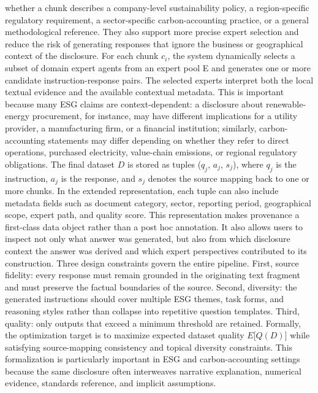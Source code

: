 \documentclass[9pt,twocolumn]{extarticle}
\begin{document}
whether a chunk describes a company-level sustainability policy, a
region-specific regulatory requirement, a sector-specific
carbon-accounting practice, or a general methodological reference. They
also support more precise expert selection and reduce the risk of
generating responses that ignore the business or geographical context of
the disclosure.
For each chunk \(c_{i}\), the system dynamically selects a subset of
domain expert agents from an expert pool E and generates one or more
candidate instruction-response pairs. The selected experts interpret
both the local textual evidence and the available contextual metadata.
This is important because many ESG claims are context-dependent: a
disclosure about renewable-energy procurement, for instance, may have
different implications for a utility provider, a manufacturing firm, or
a financial institution; similarly, carbon-accounting statements may
differ depending on whether they refer to direct operations, purchased
electricity, value-chain emissions, or regional regulatory obligations.
The final dataset \(D\) is stored as tuples (\(q_{j}\), \(a_{j}\),
\(s_{j}\)), where \(q_{j}\) is the instruction, \(a_{j}\) is the
response, and \(s_{j}\) denotes the source mapping back to one or more
chunks. In the extended representation, each tuple can also include
metadata fields such as document category, sector, reporting period,
geographical scope, expert path, and quality score. This representation
makes provenance a first-class data object rather than a post hoc
annotation. It also allows users to inspect not only what answer was
generated, but also from which disclosure context the answer was derived
and which expert perspectives contributed to its construction.
Three design constraints govern the entire pipeline. First, source
fidelity: every response must remain grounded in the originating text
fragment and must preserve the factual boundaries of the source. Second,
diversity: the generated instructions should cover multiple ESG themes,
task forms, and reasoning styles rather than collapse into repetitive
question templates. Third, quality: only outputs that exceed a minimum
threshold are retained. Formally, the optimization target is to maximize
expected dataset quality \(E\lbrack Q(D)\rbrack\) while satisfying
source-mapping consistency and topical diversity constraints. This
formalization is particularly important in ESG and carbon-accounting
settings because the same disclosure often interweaves narrative
explanation, numerical evidence, standards reference, and implicit
assumptions.
\end{document}
